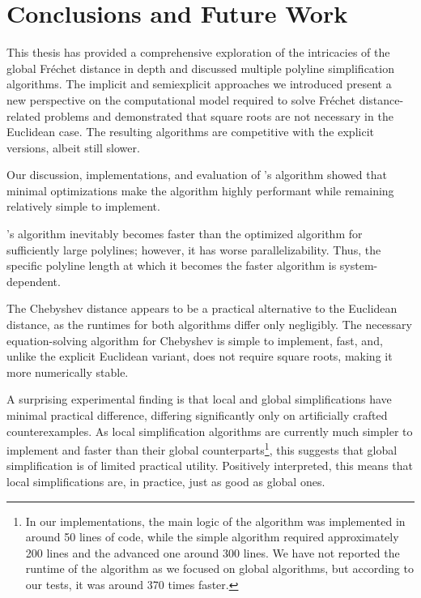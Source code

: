 \section{Conclusions and Future Work}
\label{sec:discussion_conclusion}

This thesis has provided a comprehensive exploration of the intricacies of the global Fréchet distance in depth and discussed multiple polyline simplification algorithms.
The implicit and semiexplicit approaches we introduced present a new perspective on the computational model required to solve Fréchet distance-related problems and demonstrated that square roots are not necessary in the Euclidean case. The resulting algorithms are competitive with the explicit versions, albeit still slower.

Our discussion, implementations, and evaluation of \citeauthor{on_optimal_polyline_simplification_using_the_hausdorff_and_frechet_distance}'s algorithm showed that minimal optimizations make the algorithm highly performant while remaining relatively simple to implement.

\citeauthor{polyline_simplification_has_cubic_complexity_bringmannetal}'s algorithm inevitably becomes faster than the optimized \citeauthor{on_optimal_polyline_simplification_using_the_hausdorff_and_frechet_distance} algorithm for sufficiently large polylines; however, it has worse parallelizability. Thus, the specific polyline length at which it becomes the faster algorithm is system-dependent.

The Chebyshev distance appears to be a practical alternative to the Euclidean distance, as the runtimes for both algorithms differ only negligibly. The necessary equation-solving algorithm for Chebyshev is simple to implement, fast, and, unlike the explicit Euclidean variant, does not require square roots, making it more numerically stable.

A surprising experimental finding is that local and global simplifications have minimal practical difference, differing significantly only on artificially crafted counterexamples. As local simplification algorithms are currently much simpler to implement and faster than their global counterparts\footnote{In our implementations, the main logic of the \citeauthor{computational_geometric_methods_for_polygonal_approximations_of_a_curve} algorithm was implemented in around 50 lines of code, while the simple algorithm required approximately 200 lines and the advanced one around 300 lines. We have not reported the runtime of the \citeauthor{computational_geometric_methods_for_polygonal_approximations_of_a_curve} algorithm as we focused on global algorithms, but according to our tests, it was around 370 times faster.}, this suggests that global simplification is of limited practical utility. Positively interpreted, this means that local simplifications are, in practice, just as good as global ones.

